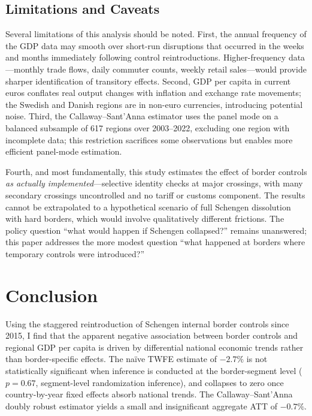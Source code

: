 \documentclass[12pt]{article}
\begin{document}
\subsection{Limitations and Caveats}

Several limitations of this analysis should be noted. First, the annual frequency of the GDP data may smooth over short-run disruptions that occurred in the weeks and months immediately following control reintroductions. Higher-frequency data---monthly trade flows, daily commuter counts, weekly retail sales---would provide sharper identification of transitory effects. Second, GDP per capita in current euros conflates real output changes with inflation and exchange rate movements; the Swedish and Danish regions are in non-euro currencies, introducing potential noise. Third, the Callaway--Sant'Anna estimator uses the panel mode on a balanced subsample of 617 regions over 2003--2022, excluding one region with incomplete data; this restriction sacrifices some observations but enables more efficient panel-mode estimation.

Fourth, and most fundamentally, this study estimates the effect of border controls \textit{as actually implemented}---selective identity checks at major crossings, with many secondary crossings uncontrolled and no tariff or customs component. The results cannot be extrapolated to a hypothetical scenario of full Schengen dissolution with hard borders, which would involve qualitatively different frictions. The policy question ``what would happen if Schengen collapsed?'' remains unanswered; this paper addresses the more modest question ``what happened at borders where temporary controls were introduced?''


\section{Conclusion}

Using the staggered reintroduction of Schengen internal border controls since 2015, I find that the apparent negative association between border controls and regional GDP per capita is driven by differential national economic trends rather than border-specific effects. The na\"ive TWFE estimate of $-2.7\%$ is not statistically significant when inference is conducted at the border-segment level ($p = 0.67$, segment-level randomization inference), and collapses to zero once country-by-year fixed effects absorb national trends. The Callaway--Sant'Anna doubly robust estimator yields a small and insignificant aggregate ATT of $-0.7\%$.
\end{document}
